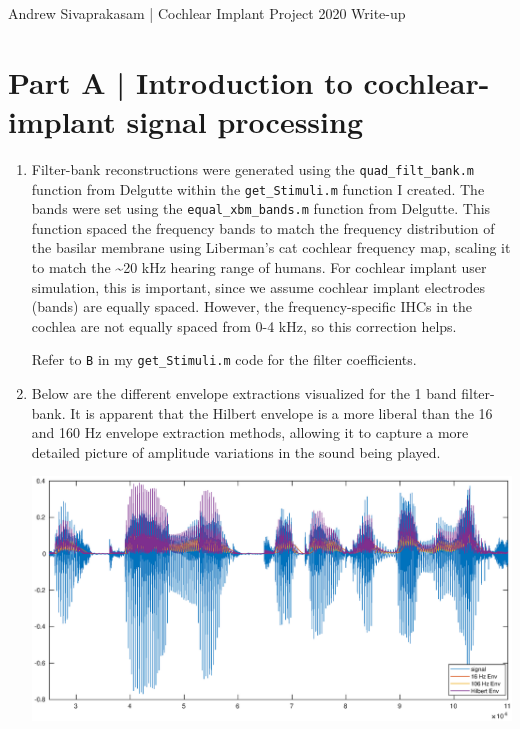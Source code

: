 \documentclass[9pt]{extarticle}
\begin{document}
{\huge Andrew Sivaprakasam | Cochlear Implant Project 2020 Write-up}

\section{Part A | Introduction to cochlear-implant signal processing}

\begin{enumerate}[label = \alph*) ]
\item Filter-bank reconstructions were generated using the \verb|quad_filt_bank.m| function from Delgutte within the \verb|get_Stimuli.m| function I created. The bands were set using the \verb|equal_xbm_bands.m| function from Delgutte. This function spaced the frequency bands to match the frequency distribution of the basilar membrane using Liberman's cat cochlear frequency map, scaling it to match the \textasciitilde 20 kHz hearing range of humans. For cochlear implant user simulation, this is important, since we assume cochlear implant electrodes (bands) are equally spaced. However, the frequency-specific IHCs in the cochlea are not equally spaced from 0-4 kHz, so this correction helps.  

\vspace{.5em}

Refer to \verb|B| in my \verb|get_Stimuli.m| code for the filter coefficients. 

\item Below are the different envelope extractions visualized for the 1 band filter-bank. It is apparent that the Hilbert envelope is a more liberal than the 16 and 160 Hz envelope extraction methods, allowing it to capture a more detailed picture of amplitude variations in the sound being played. 

\begin{center}
\includegraphics[width = .85\textwidth]{envelopes}
\end{center}


\end{enumerate}
\end{document}
